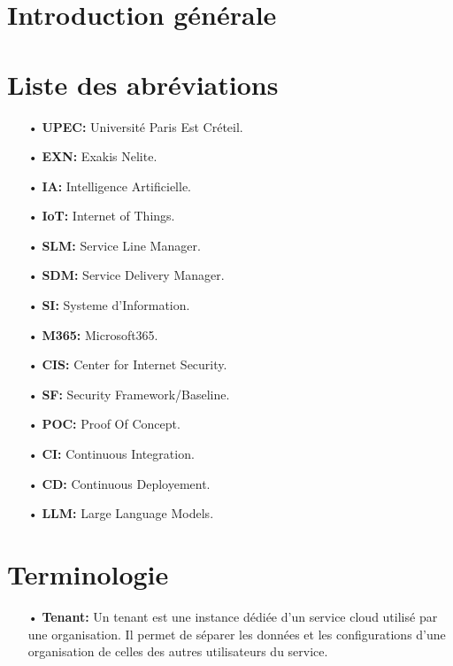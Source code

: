 \documentclass[a4paper]{report}
\begin{document}
\begin{doublespace}
	\chapter*{\centering Introduction générale}
	

	\chapter*{\centering Liste des abréviations}
	\begin{itemize}
		  \item[•] \textbf{UPEC:} Université Paris Est Créteil.
		  \item[•] \textbf{EXN:} Exakis Nelite.
            \item[•] \textbf{IA:} Intelligence Artificielle.
            \item[•] \textbf{IoT:} Internet of Things.
            \item[•] \textbf{SLM:} Service Line Manager.
            \item[•] \textbf{SDM:} Service Delivery Manager.
            \item[•] \textbf{SI:} Systeme d'Information.
            \item[•] \textbf{M365:} Microsoft365.
            \item[•] \textbf{CIS:} Center for Internet Security.
		  \item[•] \textbf{SF:} Security Framework/Baseline.
            \item[•] \textbf{POC:} Proof Of Concept. 
		  \item[•] \textbf{CI:} Continuous Integration.
		  \item[•] \textbf{CD:} Continuous Deployement.
            \item[•] \textbf{LLM:} Large Language Models.
	\end{itemize}

	\newpage
 
	\chapter*{\centering Terminologie}
	\begin{itemize}
    \item[•] \textbf{Tenant:} Un tenant est une instance dédiée d'un service cloud utilisé par une organisation. Il permet de séparer les données et les configurations d'une organisation de celles des autres utilisateurs du service.
    

\end{itemize}
\end{doublespace}
\end{document}
